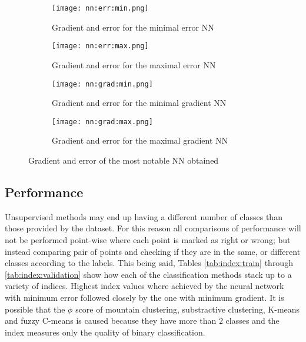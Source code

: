 \begin{figure*}[ht]
    \begin{subfigure}[t]{0.49\linewidth}
        \texttt{[image: nn:err:min.png]}
        \caption{Gradient and error for the minimal error NN
        \label{fig:nn:err:min}}
    \end{subfigure}
    \hfill
    \begin{subfigure}[t]{0.49\linewidth}
        \texttt{[image: nn:err:max.png]}
        \caption{Gradient and error for the maximal error NN
        \label{fig:nn:err:max}}
    \end{subfigure}
    
    \begin{subfigure}[b]{0.49\linewidth}
        \texttt{[image: nn:grad:min.png]}
        \caption{Gradient and error for the minimal gradient NN
        \label{fig:nn:grad:min}}
    \end{subfigure}
    \hfill
    \begin{subfigure}[b]{0.49\linewidth}
        \texttt{[image: nn:grad:max.png]}
        \caption{Gradient and error for the maximal gradient NN
        \label{fig:nn:grad:max}}
    \end{subfigure}
    \caption{Gradient and error of the most notable NN obtained 
        \label{fig:nn}}
\end{figure*}

\subsection{Performance}

Unsupervised methods may end up having a different number of classes than those
provided by the dataset. For this reason all comparisons of performance will not
be performed point-wise where each point is marked as right or wrong; but
instead comparing pair of points and checking if they are in the same, or
different classes according to the labels. This being said, Tables
\ref{tab:index:train} through \ref{tab:index:validation} show how each of the
classification methods stack up to a variety of indices. Highest index values
where achieved by the neural network with minimum error followed closely by the
one with minimum gradient. It is possible that the $\phi$ score of mountain
clustering, substractive clustering, K-means and fuzzy C-means is caused because
they have more than $2$ classes and the index measures only the quality of
binary classification.

